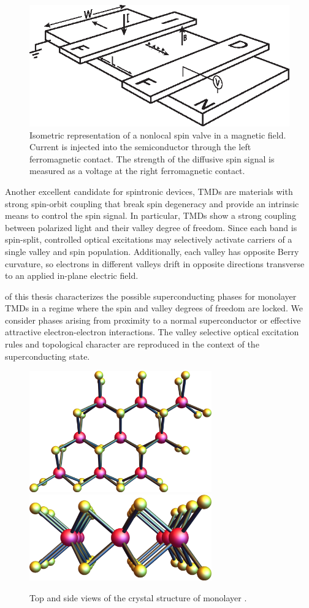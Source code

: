 \begin{figure}[b]
  \centering
  \includegraphics[width=\textwidth]{figures/device}
  \caption{%
    Isometric representation of a nonlocal spin valve in a magnetic field.
    Current is injected into the semiconductor
    through the left ferromagnetic contact.
    The strength of the diffusive spin signal is measured as a voltage
    at the right ferromagnetic contact.
  }\label{fig:spin-device}
\end{figure}

Another excellent candidate for spintronic devices,
TMDs are materials with strong spin-orbit coupling that break spin degeneracy
and provide an intrinsic means to control the spin signal.
In particular, TMDs show a strong coupling
between polarized light and their valley degree of freedom.
Since each band is spin-split, controlled optical excitations
may selectively activate carriers of a single valley and spin population.
Additionally, each valley has opposite Berry curvature, so
electrons in different valleys drift in opposite directions transverse
to an applied in-plane electric field.

 of this thesis
characterizes the possible superconducting phases for monolayer TMDs
in a regime where the spin and valley degrees of freedom are locked.
We consider phases arising from proximity to a normal superconductor
or effective attractive electron-electron interactions.
The valley selective optical excitation rules
and topological character are reproduced
in the context of the superconducting state.

\begin{figure}
  \centering
  \includegraphics[width=0.7\textwidth]{figures/tmd-crystal-top.png}
  \includegraphics[width=0.7\textwidth]{figures/tmd-crystal-side.png}
  \caption{%
    Top and side views of the crystal structure of monolayer .
  }\label{fig:tmd-crystal}
\end{figure}
